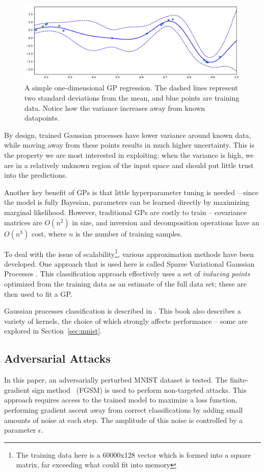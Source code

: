 \documentclass{article}
\begin{document}
\begin{figure}[htb]
\centering
\includegraphics[width=\hsize]{figures/gp_basic.pdf}
\caption{A simple one-dimensional GP regression. The dashed lines represent two standard deviations from the mean, and blue points are training data. Notice how the variance increases away from known datapoints.}
\label{fig:gp:basic}
\end{figure}

By design, trained Gaussian processes have lower variance around known data, while moving away from these points results in much higher uncertainty. This is the property we are most interested in exploiting: when the variance is high, we are in a relatively unknown region of the input space and should put little trust into the predictions.

Another key benefit of GPs is that little hyperparameter tuning is needed -- since the model is fully Bayesian, parameters can be learned directly by maximizing marginal likelihood. However, traditional GPs are costly to train -- covariance matrices are $O(n^2)$ in size, and inversion and decomposition operations have an $O(n^3)$ cost, where $n$ is the number of training samples.

To deal with the issue of scalability\footnote{The training data here is a 60000x128 vector which is formed into a square matrix, far exceeding what could fit into memory}, various approximation methods have been developed. One approach that is used here is called Sparse Variational Gaussian Processes \cite{hensman2015scalable}. This classification approach effectively uses a set of \textit{inducing points} optimized from the training data as an estimate of the full data set; these are then used to fit a GP.

Gaussian processes classification is described in \citet*{rasmussen2006gaussian}. This book also describes a variety of kernels, the choice of which strongly affects performance -- some are explored in Section~\ref{sec:mnist}. 

\subsection{Adversarial Attacks}
\label{sec:background:adv}
% 
In this paper, an adversarially perturbed MNIST dataset is tested. The finite-gradient sign method~\cite{goodfellow2014explaining} (FGSM) is used to perform non-targeted attacks. This approach requires access to the trained model to maximize a loss function, performing gradient ascent away from correct classifications by adding small amounts of noise at each step. The amplitude of this noise is controlled by a parameter $\epsilon$.
\end{document}
